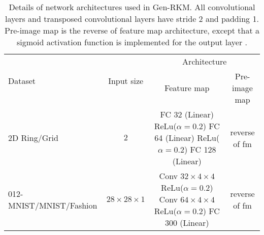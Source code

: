 \begin{table}[ht]
\centering
\begin{tabular}{lccc}
\toprule
\multirow{2}{*}{Dataset} & \multirow{2}{*}{Input size} & \multicolumn{2}{c}{Architecture} \\
\cmidrule(lr){3-4}
 & & Feature map & Pre-image map \\
\midrule
2D Ring/Grid & $2$ & \makecell{FC 32 (Linear)\\ ReLu($\alpha=0.2$) \\ FC 64 (Linear) \\ ReLu($\alpha=0.2$) \\ FC 128 (Linear) } &  reverse of fm \\
\midrule
012-MNIST/MNIST/Fashion& $28\times 28\times 1$ & \makecell{Conv $32\times 4\times 4$\\ReLu($\alpha=0.2$) \\ Conv $64\times 4\times 4$ \\ ReLu($\alpha=0.2$) \\ FC 300 (Linear)}   & reverse of fm   \\


\bottomrule
\end{tabular}
\caption{Details of network architectures used in Gen-RKM. All convolutional layers and transposed convolutional layers have stride 2 and padding 1. Pre-image map is the reverse of feature map architecture, except that a sigmoid activation function is implemented for the output layer \cite{pandeyGenerativeRestrictedKernel2021}.}
\label{tab-network-architecture}
\end{table}
